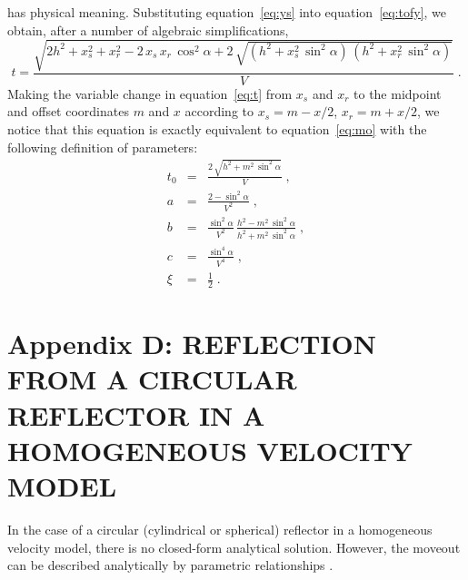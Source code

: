 has physical meaning. Substituting equation~\ref{eq:ys} into
equation~\ref{eq:tofy}, we obtain, after a number of algebraic
simplifications,
\begin{equation}
  \label{eq:t}
  t = \frac{\sqrt{2 h^2 + x_s^2 + x_r^2 - 2\,x_s\,x_r\,\cos^2{\alpha} + 
      2\,\sqrt{(h^2+x_s^2\,\sin^2{\alpha})\,(h^2+x_r^2\,\sin^2{\alpha})}}}{V}\;.
\end{equation}
Making the variable change in equation~\ref{eq:t} from $x_s$ and $x_r$
to the midpoint and offset coordinates $m$ and $x$ according to
$x_s=m-x/2$, $x_r=m+x/2$, we notice that this equation is exactly
equivalent to equation~\ref{eq:mo} with the following definition of
parameters:
\begin{eqnarray}
\label{eq:th}
t_0 & = & \frac{2\,\sqrt{h^2 + m^2\,\sin^2{\alpha}}}{V}\;, \\
\label{eq:ah}
a & = & \frac{2-\sin^2{\alpha}}{V^2}\;, \\
\label{eq:bh}
b & = & \frac{\sin^2{\alpha}}{V^2}\,\frac{h^2 - m^2\,\sin^2{\alpha}}{h^2 + m^2\,\sin^2{\alpha}}\;, \\
\label{eq:ch}
c & = & \frac{\sin^4{\alpha}}{V^4}\;, \\
\label{eq:xh}
\xi & = & \frac{1}{2}\;.
\end{eqnarray}

\appendix
\section{Appendix D: REFLECTION FROM A CIRCULAR REFLECTOR IN A HOMOGENEOUS VELOCITY MODEL}

In the case of a circular (cylindrical or spherical) reflector in a
homogeneous velocity model, there is no closed-form analytical
solution. However, the moveout can be described analytically by
parametric relationships \cite[]{mirror}.


